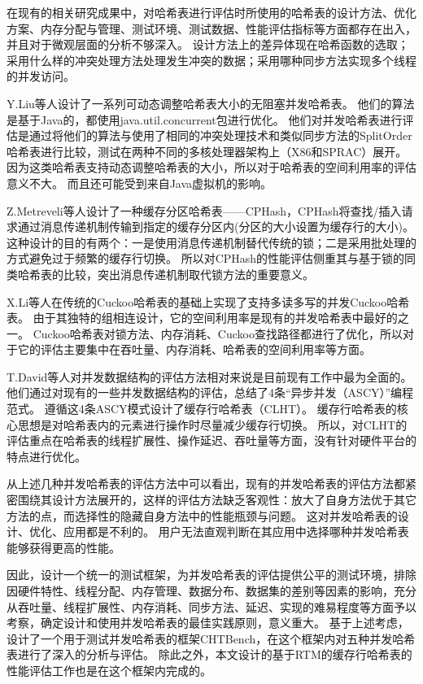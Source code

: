 在现有的相关研究成果中\cite{clht,cuckoo,hopscotch,metreveli2012cphash,nonblocking}，对哈希表进行评估时所使用的哈希表的设计方法、优化方案、内存分配与管理、测试环境、测试数据、性能评估指标等方面都存在出入，并且对于微观层面的分析不够深入。
设计方法上的差异体现在哈希函数的选取；采用什么样的冲突处理方法处理发生冲突的数据；采用哪种同步方法实现多个线程的并发访问。

Y.Liu等人设计了一系列可动态调整哈希表大小的无阻塞并发哈希表\cite{nonblocking}。
他们的算法是基于Java的，都使用java.util.concurrent包进行优化。
他们对并发哈希表进行评估是通过将他们的算法与使用了相同的冲突处理技术和类似同步方法的SplitOrder哈希表\cite{shalev2006split}进行比较，测试在两种不同的多核处理器架构上（X86和SPRAC）展开。
因为这类哈希表支持动态调整哈希表的大小，所以对于哈希表的空间利用率的评估意义不大。
而且还可能受到来自Java虚拟机的影响。

Z.Metreveli等人设计了一种缓存分区哈希表——CPHash\cite{metreveli2012cphash}，CPHash将查找/插入请求通过消息传递机制传输到指定的缓存分区内(分区的大小设置为缓存行的大小)。这种设计的目的有两个：一是使用消息传递机制替代传统的锁；二是采用批处理的方式避免过于频繁的缓存行切换。
所以对CPHash的性能评估侧重其与基于锁的同类哈希表的比较，突出消息传递机制取代锁方法的重要意义。

X.Li等人在传统的Cuckoo哈希表的基础上实现了支持多读多写的并发Cuckoo哈希表\cite{cuckoo}。
由于其独特的组相连设计，它的空间利用率是现有的并发哈希表中最好的之一。
Cuckoo哈希表对锁方法、内存消耗、Cuckoo查找路径都进行了优化，所以对于它的评估主要集中在吞吐量、内存消耗、哈希表的空间利用率等方面。

T.David等人对并发数据结构的评估方法相对来说是目前现有工作中最为全面的\cite{clht}。
他们通过对现有的一些并发数据结构的评估，总结了4条“异步并发（ASCY）”编程范式。
遵循这4条ASCY模式设计了缓存行哈希表（CLHT）。
缓存行哈希表的核心思想是对哈希表内的元素进行操作时尽量减少缓存行切换。
所以，对CLHT的评估重点在哈希表的线程扩展性、操作延迟、吞吐量等方面，没有针对硬件平台的特点进行优化。

从上述几种并发哈希表的评估方法中可以看出，现有的并发哈希表的评估方法都紧密围绕其设计方法展开的，这样的评估方法缺乏客观性：放大了自身方法优于其它方法的点，而选择性的隐藏自身方法中的性能瓶颈与问题。
这对并发哈希表的设计、优化、应用都是不利的。
用户无法直观判断在其应用中选择哪种并发哈希表能够获得更高的性能。

因此，设计一个统一的测试框架，为并发哈希表的评估提供公平的测试环境，排除因硬件特性、线程分配、内存管理、数据分布、数据集的差别等因素的影响，充分从吞吐量、线程扩展性、内存消耗、同步方法、延迟、实现的难易程度等方面予以考察，确定设计和使用并发哈希表的最佳实践原则，意义重大。
基于上述考虑，设计了一个用于测试并发哈希表的框架CHTBench，在这个框架内对五种并发哈希表进行了深入的分析与评估。
除此之外，本文设计的基于RTM的缓存行哈希表的性能评估工作也是在这个框架内完成的。

